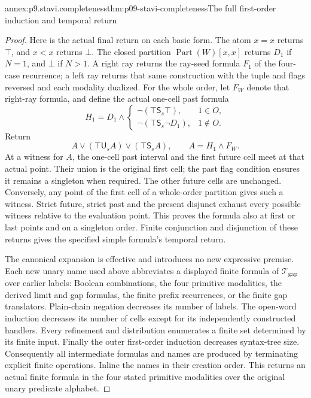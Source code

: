 \begin{annexitem}{annex:p9.stavi.completeness}{thm:p09-stavi-completeness}{The full first-order induction and temporal return}
\begin{proof}
Here is the actual final
return on each basic form.
The atom \(x=x\) returns
\(\top\), and \(x<x\)
returns \(\bot\).
The closed partition
\(\operatorname{Part}(W)[x,x]\)
returns \(D_1\) if \(N=1\),
and \(\bot\) if \(N>1\).
A right ray returns the
ray-seed formula \(F_1\)
of the four-case recurrence;
a left ray returns that
same construction with
the tuple and flags
reversed and each modality
dualized. For the whole
order, let \(F_W\) denote
that right-ray formula,
and define the actual
one-cell past formula
\[
 H_1=
 D_1\land
 \begin{cases}
  \neg(\top\mathbin{\mathsf S_s}\top),&1\in O,\\
  \neg(\top\mathbin{\mathsf S_s}\neg D_1),&1\notin O.
 \end{cases}
\]
Return
\[
 A\lor(\top\mathbin{\mathsf U_s}A)
       \lor(\top\mathbin{\mathsf S_s}A),
             \qquad A=H_1\land F_W.
\]
At a witness for \(A\),
the one-cell past interval
and the first future cell
meet at that actual point.
Their union is the
original first cell;
the past flag condition
ensures it remains a
singleton when required.
The other future cells
are unchanged. Conversely,
any point of the first
cell of a whole-order
partition gives such
a witness. Strict
future, strict past
and the present
disjunct exhaust every
possible witness relative
to the evaluation point.
This proves the formula
also at first or last
points and on a
singleton order.
Finite conjunction and
disjunction of these
returns gives the
specified simple formula's
temporal return.

The canonical expansion
is effective and
introduces no new
expressive premise.
Each new unary name
used above abbreviates
a displayed finite
formula of
\(\mathcal T_{\mathrm{gap}}\)
over earlier labels:
Boolean combinations,
the four primitive
modalities, the
derived limit and
gap formulas, the
finite prefix
recurrences, or the
finite gap translators.
Plain-chain negation
decreases its number
of labels. The
open-word induction
decreases its number
of cells except for
its independently
constructed handlers.
Every refinement and
distribution enumerates
a finite set determined
by its finite input.
Finally the outer
first-order induction
decreases syntax-tree
size. Consequently
all intermediate
formulas and names
are produced by
terminating explicit
finite operations.
Inline the names
in their creation
order. This returns
an actual finite
formula in the
four stated primitive
modalities over the
original unary
predicate alphabet.


\end{proof}
\end{annexitem}
